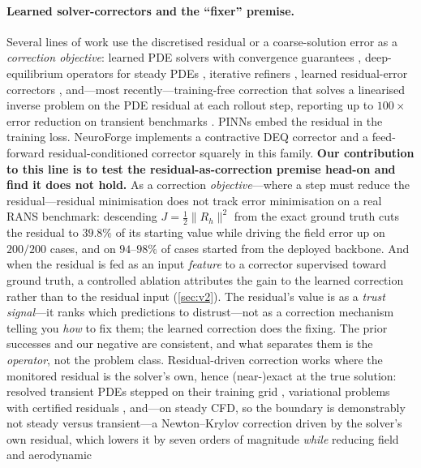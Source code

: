 \paragraph{Learned solver-correctors and the ``fixer'' premise.} Several lines of work
use the discretised residual or a coarse-solution error as a \emph{correction
objective}: learned PDE solvers with convergence guarantees \citep{hsieh2019neuralpde},
deep-equilibrium operators for steady PDEs \citep{marwah2023fnodeq}, iterative refiners
\citep{lippe2023pderefiner}, learned residual-error correctors
\citep{learned2023residualcorrection}, and---most recently---training-free correction
that solves a linearised inverse problem on the PDE residual at each rollout step,
reporting up to $100\times$ error reduction on transient benchmarks
\citep{huang2025physicscorrect}. PINNs \citep{raissi2019pinn} embed the residual
in the training loss. NeuroForge implements a contractive DEQ corrector and a
feed-forward residual-conditioned corrector squarely in this family. \textbf{Our
contribution to this line is to test the residual-as-correction premise head-on and find it
does not hold.} As a correction \emph{objective}---where a step must reduce the
residual---residual minimisation does not track error minimisation on a real RANS benchmark:
descending $J=\tfrac12\|R_h\|^2$ from the exact ground truth cuts the residual to $39.8\%$
of its starting value while driving the field error up on $200/200$ cases, and on
$94$--$98\%$ of cases started from the deployed backbone. And when the residual is fed as
an input \emph{feature} to a corrector supervised toward ground truth, a controlled
ablation attributes the gain to the learned correction rather than to the residual input
(\autoref{sec:v2}). The residual's value is as a
\emph{trust signal}---it ranks which predictions to distrust---not as a correction
mechanism telling you \emph{how} to fix them; the learned correction does the fixing.
The prior successes and our negative are consistent, and what separates them is the
\emph{operator}, not the problem class. Residual-driven correction works where the
monitored residual is the solver's own, hence (near-)exact at the true solution:
resolved transient PDEs stepped on their training grid \citep{huang2025physicscorrect},
variational problems with certified residuals \citep{learned2023residualcorrection},
and---on steady CFD, so the boundary is demonstrably not steady versus
transient---a Newton--Krylov correction driven by the solver's own residual, which
lowers it by seven orders of magnitude \emph{while} reducing field and aerodynamic

